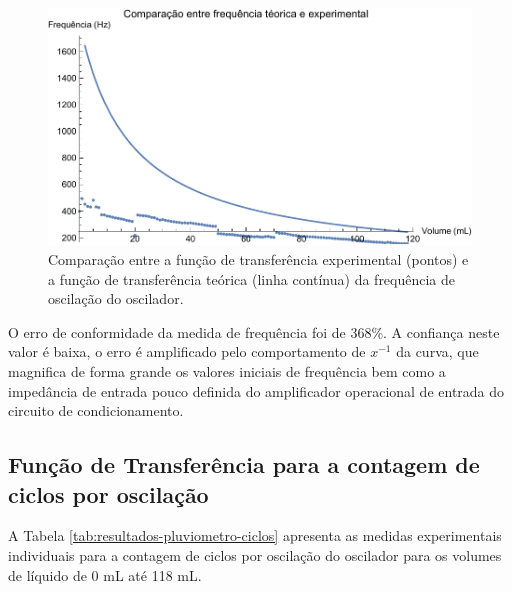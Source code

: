 \documentclass[a4paper]{instrumentacao}
\begin{document}
\begin{figure}[H]
	\centering \includegraphics[width=\textwidth]{Nivel/Experimental/Frequencia-Comparacao.pdf}
	\caption{Comparação entre a função de transferência experimental (pontos) e a função de transferência teórica (linha contínua) da frequência de oscilação do oscilador.}
	\label{fig:resultados-pluviometro-frequencia-comparacao}
\end{figure}

O erro de conformidade da medida de frequência foi de 368\%. A confiança neste valor é baixa, o erro é amplificado pelo comportamento de $x^{-1}$ da curva, que magnifica de forma grande os valores iniciais de frequência bem como a impedância de entrada pouco definida do amplificador operacional de entrada do circuito de condicionamento.

\subsection{Função de Transferência para a contagem de ciclos por oscilação}

A Tabela \ref{tab:resultados-pluviometro-ciclos} apresenta as medidas experimentais individuais para a contagem de ciclos por oscilação do oscilador para os volumes de líquido de 0 mL até 118 mL.
\end{document}
